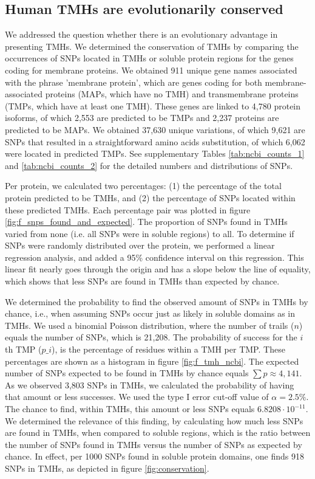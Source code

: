 \subsection{Human TMHs are evolutionarily conserved}


We addressed the question whether there is an evolutionary advantage in presenting TMHs.
We determined the conservation of TMHs 
by comparing the occurrences of SNPs located in TMHs or soluble protein regions 
for the genes coding for membrane proteins.
We obtained 911 unique gene names associated with the phrase 'membrane protein',
which are genes coding for both membrane-associated proteins (MAPs, which have no TMH) and 
transmembrane proteins (TMPs, which have at least one TMH).
These genes are linked to 4,780 protein isoforms, 
of which 2,553 are predicted to be TMPs and 
2,237 proteins are predicted to be MAPs.
We obtained 37,630 unique variations, 
of which 9,621 are SNPs that resulted in a straightforward amino acids substitution, 
of which 6,062 were located in predicted TMPs.
See supplementary Tables \ref{tab:ncbi_counts_1} and \ref{tab:ncbi_counts_2} 
for the detailed numbers and distributions of SNPs.

Per protein, we calculated two percentages: 
(1) the percentage of the total protein predicted to be TMHs, 
and (2) the percentage of SNPs located within these predicted TMHs.
Each percentage pair was plotted in figure \ref{fig:f_snps_found_and_expected}.
The proportion of SNPs found in TMHs varied from 
none (i.e. all SNPs were in
soluble regions) to all.
To determine if SNPs were randomly distributed over the protein, we performed a linear regression analysis,
and added a 95\% confidence interval on this regression.
This linear fit nearly goes through the origin and has a slope
below the line of equality,
which shows that less SNPs are found in TMHs than expected by chance.

We determined the probability to find the observed amount
of SNPs in TMHs by chance, i.e., when assuming SNPs occur 
just as likely in soluble domains as in TMHs.
We used a binomial Poisson distribution, 
where the number of trails ($n$) equals the number of SNPs, 
which is 21,208. 
The probability of success for the $i$th TMP ($p\_i$), 
is the percentage of residues within a TMH per TMP. 
These percentages are shown as a histogram 
in figure \ref{fig:f_tmh_ncbi}. 
The expected number of SNPs expected to be found in 
TMHs by chance equals $\sum{p} \approx 4,141$.
As we observed 3,803 SNPs in TMHs, 
we calculated the probability of having that amount or less successes.
We used the type I error cut-off value of $\alpha = 2.5\%$.
The chance to find, within TMHs, this amount or less SNPs 
equals $6.8208 \cdot 10^{-11}$.
We determined the relevance of this finding, by
calculating how much less SNPs are found in TMHs,
when compared to soluble regions, which is the
ratio between the number of SNPs found in TMHs
versus the number of SNPs as expected by chance.
In effect, per 1000 SNPs found in soluble protein domains, 
one finds 918 SNPs in TMHs,
as depicted in figure \ref{fig:conservation}. 


